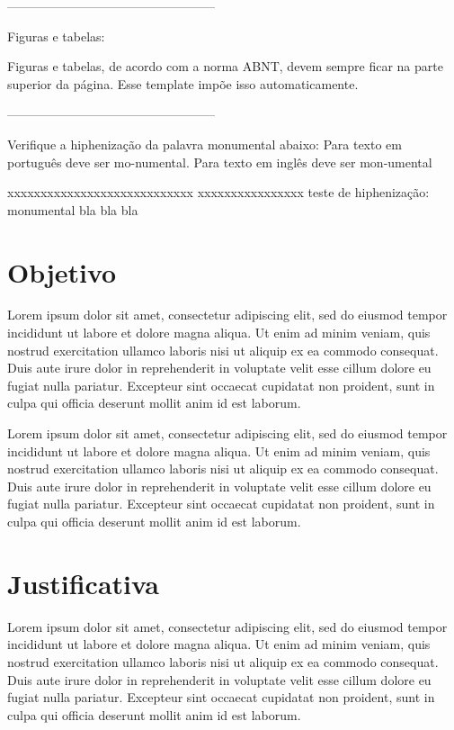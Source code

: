 --------------------------------------------------

Figuras e tabelas:

Figuras e tabelas, de acordo com a norma ABNT, devem sempre ficar na parte superior da página. Esse template impõe isso automaticamente. 

--------------------------------------------------

Verifique a hiphenização da palavra monumental abaixo: Para texto em português deve ser mo-numental. Para texto em inglês deve ser mon-umental

 xxxxxxxxxxxxxxxxxxxxxxxxxxxx xxxxxxxxxxxxxxxx teste de hiphenização: monumental bla bla bla





\section*{Objetivo}

Lorem ipsum dolor sit amet, consectetur adipiscing elit, sed do eiusmod tempor incididunt ut labore et dolore magna aliqua. Ut enim ad minim veniam, quis nostrud exercitation ullamco laboris nisi ut aliquip ex ea commodo consequat. Duis aute irure dolor in reprehenderit in voluptate velit esse cillum dolore eu fugiat nulla pariatur. Excepteur sint occaecat cupidatat non proident, sunt in culpa qui officia deserunt mollit anim id est laborum.

Lorem ipsum dolor sit amet, consectetur adipiscing elit, sed do eiusmod tempor incididunt ut labore et dolore magna aliqua. Ut enim ad minim veniam, quis nostrud exercitation ullamco laboris nisi ut aliquip ex ea commodo consequat. Duis aute irure dolor in reprehenderit in voluptate velit esse cillum dolore eu fugiat nulla pariatur. Excepteur sint occaecat cupidatat non proident, sunt in culpa qui officia deserunt mollit anim id est laborum.



\section*{Justificativa}

Lorem ipsum dolor sit amet, consectetur adipiscing elit, sed do eiusmod tempor incididunt ut labore et dolore magna aliqua. Ut enim ad minim veniam, quis nostrud exercitation ullamco laboris nisi ut aliquip ex ea commodo consequat. Duis aute irure dolor in reprehenderit in voluptate velit esse cillum dolore eu fugiat nulla pariatur. Excepteur sint occaecat cupidatat non proident, sunt in culpa qui officia deserunt mollit anim id est laborum.

